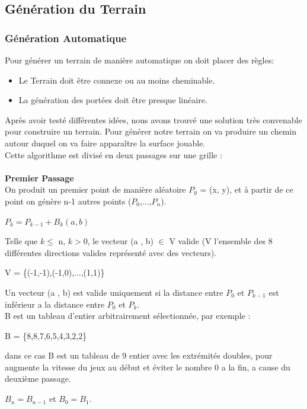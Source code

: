 \documentclass{article}
\begin{document}
\subsection{Génération du Terrain}
\subsubsection{Génération Automatique}
Pour générer un terrain de manière automatique on doit placer des règles:
\begin{itemize}
\item Le Terrain doit être connexe ou au moins cheminable.
\item La génération des portées doit être presque linéaire.

\end{itemize}
Après avoir testé différentes idées, nous avons trouvé une solution très convenable pour construire un terrain. Pour générer notre terrain on va produire un chemin autour duquel on va faire apparaître la surface jouable.\\
Cette algorithme est divisé en deux passages sur une grille :\\~\\
\textbf{\Large{Premier Passage}}\\
On produit un premier point de manière aléatoire $P_0$ = (x, y), et à partir de ce point on génère n-1 autres points ($P_0$,...,$P_n$).
\begin{center}
	$P_{k} = P_{k-1} + B_k(a, b)$
\end{center}
Telle que $k\leq$ n, $k>0$, le vecteur (a , b) $\in$ V valide (V l'ensemble des 8 différentes directions valides représenté avec des vecteurs).
\begin{center}
	V = \{(-1,-1),(-1,0),...,(1,1)\}
\end{center}	
Un vecteur (a , b) est valide uniquement si la distance entre $P_0$ et $P_{k-1}$ est inférieur a la distance entre $P_0$ et $P_k$.\\
B est un tableau d'entier arbitrairement sélectionnée, par exemple :
\begin{center}
	B = \{8,8,7,6,5,4,3,2,2\}\\
\end{center}
dans ce cas B est un tableau de 9 entier avec les extrémités doubles, pour augmente la vitesse du jeux au début et éviter le nombre 0 a la fin, a cause du deuxième passage.
\begin{center}
	$B_n = B_{n-1}$ et $B_0 = B_1$.
\end{center}
\end{document}
